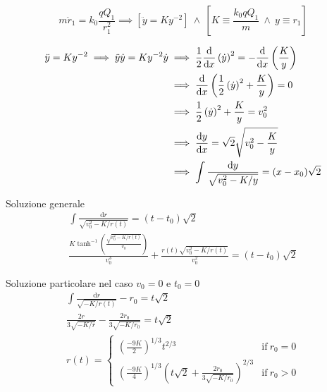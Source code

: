 \documentclass[12pt]{report}
\begin{document}
\begin{equation}
  \label{eq:initial}
  m\ddot{r}_1 = k_0 \frac{qQ_1}{r_1^2} \implies
  \left[\ddot{y} = Ky^{-2}\right] ~\wedge~ \left[K \equiv \frac{k_0qQ_1}{m} ~\wedge~ y \equiv r_1 \right]
\end{equation}

\begin{align*}
  \ddot{y} = Ky^{-2} \implies
  \ddot{y}\dot{y} = Ky^{-2}\dot{y} &\implies
                                     \frac{1}{2}\dv{x}\left(\dot{y}\right)^2 = -\dv{x}\left(\frac{K}{y}\right) \\
                                   &\implies \dv{x}\left(\frac{1}{2}\left(\dot{y}\right)^2 + \frac{K}{y}\right) = 0 \\
                                   &\implies \frac{1}{2}\left(\dot{y}\right)^2 + \frac{K}{y} = v_0^2 \\
                                   &\implies \dv{y}{x} = \sqrt{2}\sqrt{v_0^2 - \frac{K}{y}} \\
                                   &\implies \int \frac{\text{d}y}{\sqrt{v_0^2 - K/y}} = (x - x_0)\sqrt{2}
\end{align*}

Soluzione generale
\begin{equation}
  \label{eq:general}
  \begin{gathered}
    \int \frac{\text{d}r}{\sqrt{v_0^2 - K/r(t)}} = (t - t_0)\sqrt{2} \\
    \frac{K\tanh^{-1}\left(\frac{\sqrt{v_0^2-K/r(t)}}{v_0}\right)}{v_0^3} + \frac{r(t)\sqrt{v_0^2 - K/r(t)}}{v_0^2} = (t - t_0)\sqrt{2}
  \end{gathered}
\end{equation}

Soluzione particolare nel caso $v_0 = 0$ e $t_0 = 0$
\begin{equation}
  \label{eq:general}
  \begin{gathered}
    \int \frac{\text{d}r}{\sqrt{-K/r(t)}} - r_0 = t\sqrt{2} \\
    \frac{2r}{3\sqrt{-K/r}} - \frac{2r_0}{3\sqrt{-K/r_0}} = t\sqrt{2} \\
    r(t) =
    \begin{cases}
      \left(\frac{-9K}{2}\right)^{1/3}t^{2/3} & \text{if} ~ r_0 = 0 \\
      \left(\frac{-9K}{4}\right)^{1/3}\left(t\sqrt{2} + \frac{2r_0}{3\sqrt{-K/r_0}}\right)^{2/3} & \text{if} ~ r_0 > 0
    \end{cases}
  \end{gathered}
\end{equation}
\end{document}
